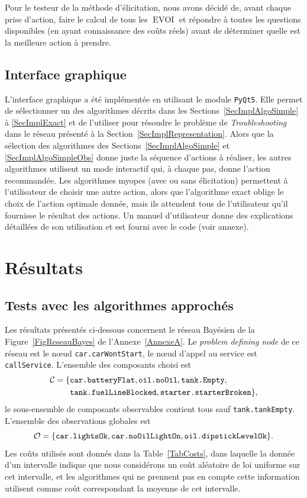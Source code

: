 \documentclass[a4paper,11pt]{article}
\theoremstyle{plain}
\theoremstyle{definition}
\DeclareMathOperator{\EVOI}{EVOI}
\begin{document}
Pour le testeur de la méthode d'élicitation, nous avons décidé de, avant chaque prise d'action, faire le calcul de tous les $\EVOI$ et répondre à toutes les questions disponibles (en ayant connaissance des coûts réels) avant de déterminer quelle est la meilleure action à prendre.

\subsection{Interface graphique}
\label{SecImplInterface}

L'interface graphique a été implémentée en utilisant le module \texttt{PyQt5}. Elle permet de sélectionner un des algorithmes décrits dans les Sections~\ref{SecImplAlgoSimple} à \ref{SecImplExact} et de l'utiliser pour résoudre le problème de \emph{Troubleshooting} dans le réseau présenté à la Section~\ref{SecImplRepresentation}. Alors que la sélection des algorithmes des Sections~\ref{SecImplAlgoSimple} et \ref{SecImplAlgoSimpleObs} donne juste la séquence d'actions à réaliser, les autres algorithmes utilisent un mode interactif qui, à chaque pas, donne l'action recommandée. Les algorithmes myopes (avec ou sans élicitation) permettent à l'utilisateur de choisir une autre action, alors que l'algorithme exact oblige le choix de l'action optimale donnée, mais ils attendent tous de l'utilisateur qu'il fournisse le résultat des actions. Un manuel d'utilisateur donne des explications détaillées de son utilisation et est fourni avec le code (voir annexe).

\section{Résultats}
\label{SecResultats}

\subsection{Tests avec les algorithmes approchés}
\label{SecResultatsApprox}

Les résultats présentés ci-dessous concernent le réseau Bayésien de la Figure~\ref{FigReseauBayes} de l'Annexe~\ref{AnnexeA}. Le \emph{problem defining node} de ce réseau est le nœud \texttt{car.carWontStart}, le nœud d'appel au service est \texttt{callService}. L'ensemble des composants choisi est
\begin{align*}
\mathcal C & = \{\text{\texttt{car.batteryFlat}}, \text{\texttt{oil.noOil}}, \text{\texttt{tank.Empty}}, \\
 & \hphantom{{} = \{} \text{\texttt{tank.fuelLineBlocked}}, \text{\texttt{starter.starterBroken}}\},
\end{align*}
le sous-ensemble de composants observables contient tous sauf \texttt{tank.tankEmpty}. L'ensemble des observations globales est
\[\mathcal O = \{\text{\texttt{car.lightsOk}}, \text{\texttt{car.noOilLightOn}}, \text{\texttt{oil.dipstickLevelOk}}\}.\]
Les coûts utilisés sont donnés dans la Table~\ref{TabCosts}, dans laquelle la donnée d'un intervalle indique que nous considérons un coût aléatoire de loi uniforme sur cet intervalle, et les algorithmes qui ne prennent pas en compte cette information utilisent comme coût correspondant la moyenne de cet intervalle.
\end{document}
